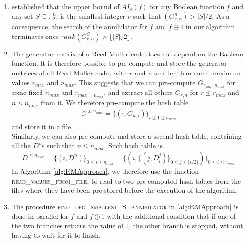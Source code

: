 \documentclass[11pt]{llncs}
\begin{document}
\begin{remark}~\label{rem:remarksOnAlg}
	\begin{enumerate}
		\item \cite{TOSC:CarMeaRot17} established that the upper bound of $AI_s(f)$ for any Boolean function $f$ and any set $S\subseteq \mathbb{F}_2^n$, is the smallest integer $r$ such that $\left(G_{r,n}^n\right) > |S| / 2$. As a consequence, the search of the annihilator for $f$ and $f\oplus 1$ in our algorithm terminates once $rank\left(G_{r,n}^S\right) > \lfloor{|S| / 2}\rfloor$.\label{item:Item1RemOnAlg}
		\item The generator matrix of a Reed-Muller code does not depend on the Boolean function. It is therefore possible to pre-compute and store the generator matrices of all Reed-Muller codes with $r$ and $n$ smaller than some maximum values $r_{max}$ and $n_{max}$.
		This suggests that we can pre-compute $G_{r_{max}, n_{max}}$ for some fixed $n_{max}$ and $r_{max = n_{max}}$, and extract all others $G_{r,n}$ for $r \leq r_{max}$ and $n \leq n_{max}$ from it.
		We therefore pre-compute the hash table
		\begin{align*}
		G^{\leq n_{max}} = \{\left(i, G_{n,i}\right)\}_{i \leq 1 \leq n_{max}}
		\end{align*}
		and store it in a file.\\
		Similarly, we can also pre-compute and store a second hash table, containing all the $D^n$s such that $n \leq n_{max}$. Such hash table is
		\begin{align*}\label{eq:degreesHashTable}
		D^{\leq n_{max}} =  \{\left(i,D^{n} \right)\}_{0 \leq i \leq n_{max}} =  \{\left(i, \{ \left(j, D_i^j\right)\}_{0\leq j \leq \lceil{i/2}\rceil} \right)\}_{0 \leq i \leq n_{max}}
		\end{align*}
		In Algorithm \ref{alg:RMApproach}, we therefore use the function \textsc{read\_values\_from\_file}, to read to two pre-computed hash tables from the files where they have been pre-stored before the execution of the algorithm.
		\item The procedure \textsc{find\_deg\_smallest\_S\_annihilator} in \ref{alg:RMApproach} is done in parallel for $f$ and $f\oplus 1$ with the additional condition that if one of the two branches returns the value of $1$, the other branch is stopped, without having to wait for it to finish.
	\end{enumerate}	
\end{remark}

\end{document}
